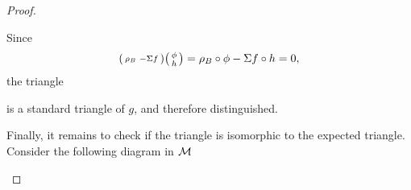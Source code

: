 \begin{proof}
\begin{enumerate}[label={(\bfseries TR\arabic*)}]
{            Since
            \[
                \begin{psmallmatrix}
                    \rho_B & -\Sigma f
                \end{psmallmatrix}
                \begin{psmallmatrix}
                    \phi \\
                    h
                \end{psmallmatrix}
                =
                \rho_B \circ \phi - \Sigma f \circ h = 0,
            \]
            the triangle
            \begin{center}
            \end{center} 
            is a standard triangle of \( g \), and therefore distinguished.

            Finally, it remains to check if the triangle is isomorphic to the expected triangle. Consider the following diagram in \( {\mathcal{M}} \)
            \begin{center}
\end{center}}
\end{enumerate}
\end{proof}
